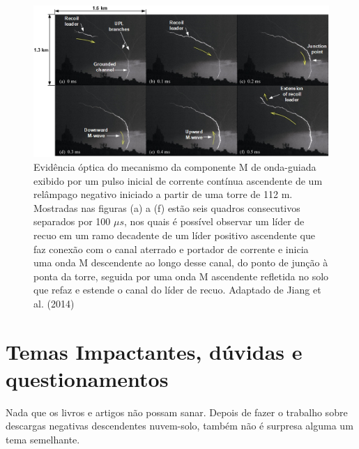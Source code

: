\documentclass[a4paper, 12pt, onecolumn,singlespacing]{article}
\begin{document}
		\begin{figure}[!h]
			\centering
			\includegraphics[width=\textwidth]{imagens/processo_componente_m.jpg}
			\caption{Evidência óptica do mecanismo da componente M de onda-guiada exibido por um pulso inicial de corrente contínua ascendente de um relâmpago negativo iniciado a partir de uma torre de 112 m. Mostradas nas figuras (a) a (f) estão seis quadros consecutivos separados por 100 $\mu s$, nos quais é possível observar um líder de recuo em um ramo decadente de um líder positivo ascendente que faz conexão com o canal aterrado e portador de corrente e inicia uma onda M descendente ao longo desse canal, do ponto de junção à ponta da torre, seguida por uma onda M ascendente refletida no solo que refaz e estende o canal do líder de recuo. Adaptado de Jiang et al. (2014)}
			\label{Component_M_explained}
		\end{figure}
		
		\section{Temas Impactantes, dúvidas e questionamentos}
		
		Nada que os livros e artigos não possam sanar. Depois de fazer o trabalho sobre descargas negativas descendentes nuvem-solo, também não é surpresa alguma um tema semelhante.
		
\end{document}
